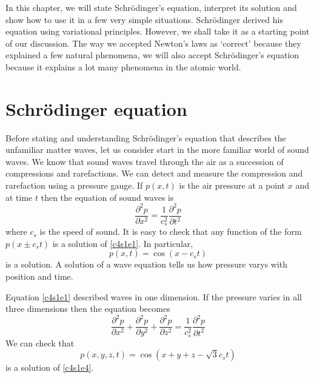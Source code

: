 In this chapter, we will state Schr\"{o}dinger's equation, interpret its
solution and show how to use it in a few very simple situations. Schr\"{o}dinger
derived \cite{schrodinger1926undulatory} his equation using variational 
principles. However, we shall take it as a starting point of our discussion.
The way we accepted Newton's laws as `correct' because they explained a few
natural phenomena, we will also accept Schr\"{o}dinger's equation because it
explains a lot many phenomena in the atomic world.

\section{Schr\"{o}dinger equation}\label{c4s1}
Before stating and understanding Schr\"{o}dinger's equation that describes
the unfamiliar matter waves, let us consider start in the more familiar world
of sound waves. We know that sound waves travel through the air as a succession
of compressions and rarefactions. We can detect and measure the compression and
rarefaction using a pressure gauge. If $p(x, t)$ is the air pressure at a point
$x$ and at time $t$ then the equation of sound waves is
\begin{equation}\label{c4s1e1}
\frac{\partial^2 p}{\partial x^2} = \frac{1}{c_s^2}
\frac{\partial^2 p}{\partial t^2}
\end{equation}
where $c_s$ is the speed of sound. It is easy to check that any function of 
the form $p(x \pm c_st)$ is a solution of \eqref{c4s1e1}. In particular,
\begin{equation}\label{c4s1e2}
p(x, t) = \cos(x - c_st)
\end{equation}
is a solution. A solution of a wave equation tells us how pressure varys with
position and time. 

Equation \eqref{c4s1e1} described waves in one dimension. If the pressure varies
in all three dimensions then the equation becomes
\begin{equation}\label{c4s1e3}
\frac{\partial^2 p}{\partial x^2} + \frac{\partial^2 p}{\partial y^2} + 
\frac{\partial^2 p}{\partial z^2} = 
\frac{1}{c_s^2} \frac{\partial^2 p}{\partial t^2}
\end{equation}
We can check that
\begin{equation}\label{c4s1e4}
p(x, y, z, t) = \cos(x + y + z - \sqrt{3} c_st)
\end{equation}
is a solution of \eqref{c4s1e4}.

